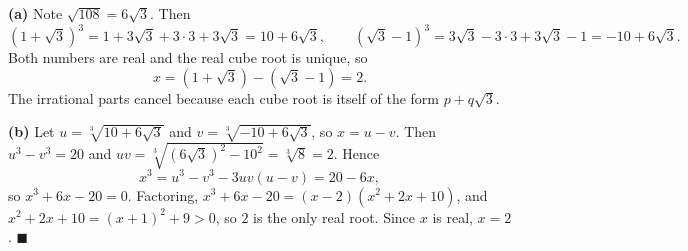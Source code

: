 \textbf{(a)} Note $\sqrt{108}=6\sqrt3$. Then
\[\left(1+\sqrt3\right)^3=1+3\sqrt3+3\cdot3+3\sqrt3=10+6\sqrt3,\qquad\left(\sqrt3-1\right)^3=3\sqrt3-3\cdot3+3\sqrt3-1=-10+6\sqrt3.\]
Both numbers are real and the real cube root is unique, so
\[x=\left(1+\sqrt3\right)-\left(\sqrt3-1\right)=\boxed{2}.\]
The irrational parts cancel because each cube root is itself of the form $p+q\sqrt3$.

\textbf{(b)} Let $u=\sqrt[3]{10+6\sqrt3}$ and $v=\sqrt[3]{-10+6\sqrt3}$, so $x=u-v$. Then $u^3-v^3=20$ and $uv=\sqrt[3]{(6\sqrt3)^2-10^2}=\sqrt[3]{8}=2$. Hence
\[x^3=u^3-v^3-3uv(u-v)=20-6x,\]
so $x^3+6x-20=0$. Factoring, $x^3+6x-20=(x-2)\left(x^2+2x+10\right)$, and $x^2+2x+10=(x+1)^2+9>0$, so $2$ is the only real root. Since $x$ is real, $x=2$. $\blacksquare$
